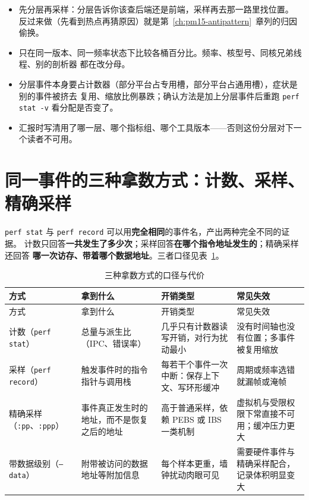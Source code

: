 \documentclass[12pt,a4paper,fontset=fandol]{ctexbook}
\newcommand{\Tp}[1]{\texttt{#1}}
\newcommand{\Mx}[1]{\textsf{#1}}
\begin{document}
\begin{bestpractice}[title={把分层当成筛子，而不是结论}]
\begin{itemize}
  \item 先分层再采样：分层告诉你该查后端还是前端，采样再去那一路里找位置。
        反过来做（先看到热点再猜原因）就是第~\ref{ch:pm15-antipattern}~章列的归因偷换。
  \item 只在同一版本、同一频率状态下比较各桶百分比。频率、核型号、同核兄弟线程、别的剖析器
        都在改分母。
  \item 分层事件本身要占计数器（部分平台占专用槽，部分平台占通用槽），症状是别的事件被挤去
        复用、缩放比例暴跌；确认方法是加上分层事件后重跑 \Tp{perf stat -v} 看分配是否变了。
  \item 汇报时写清用了哪一层、哪个指标组、哪个工具版本——否则这份分层对下一个读者不可用。
\end{itemize}
\end{bestpractice}

\section{同一事件的三种拿数方式：计数、采样、精确采样}
\label{sec:pm05-modes}

\Tp{perf stat} 与 \Tp{perf record} 可以用\textbf{完全相同}的事件名，产出两种完全不同的证据。
计数只回答\textbf{一共发生了多少次}；采样回答\textbf{在哪个指令地址发生的}；精确采样还回答
\textbf{哪一次访存、带着哪个数据地址}。三者口径见表~\ref{tab:pm05-mode}。

\begin{longtable}{>{\raggedright\arraybackslash}p{} >{\raggedright\arraybackslash}p{} >{\raggedright\arraybackslash}p{} >{\raggedright\arraybackslash}p{}}
\caption{三种拿数方式的口径与代价}\label{tab:pm05-mode}\\
\hline
方式 & 拿到什么 & 开销类型 & 常见失效 \\
\hline
\endfirsthead
\hline
方式 & 拿到什么 & 开销类型 & 常见失效 \\
\hline
\endhead
\hline
\endfoot
\hline
\endlastfoot
计数（\Tp{perf stat}） & 总量与派生比（\Mx{IPC}、错误率） &
  几乎只有计数器读写开销，对行为扰动最小 & 没有时间轴也没有位置；多事件被复用缩放 \\
采样（\Tp{perf record}） & 触发事件时的指令指针与调用栈 &
  每若干个事件一次中断：保存上下文、写环形缓冲 & 周期或频率选错就漏帧或淹帧 \\
精确采样（\Tp{:pp}、\Tp{:ppp}） & 事件真正发生时的地址，而不是恢复之后的地址 &
  高于普通采样，依赖 PEBS 或 IBS 一类机制 &
  虚拟机与受限权限下常直接不可用；缓冲压力更大 \\
带数据级别（\Tp{--data}） & 附带被访问的数据地址等附加信息 &
  每个样本更重，墙钟扰动肉眼可见 & 需要硬件事件与精确采样配合，记录体积明显变大 \\
\end{longtable}
\end{document}
